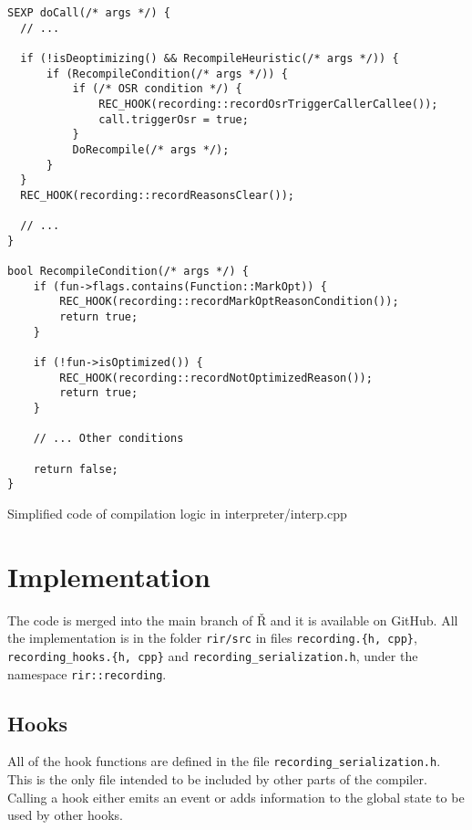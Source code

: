 \begin{listing}
	\centering
	\begin{verbatim}
SEXP doCall(/* args */) {
  // ...

  if (!isDeoptimizing() && RecompileHeuristic(/* args */)) {
      if (RecompileCondition(/* args */)) {
          if (/* OSR condition */) {
              REC_HOOK(recording::recordOsrTriggerCallerCallee());
              call.triggerOsr = true;
          }
          DoRecompile(/* args */);
      }
  }
  REC_HOOK(recording::recordReasonsClear());

  // ...
}

bool RecompileCondition(/* args */) {
    if (fun->flags.contains(Function::MarkOpt)) {
        REC_HOOK(recording::recordMarkOptReasonCondition());
        return true;
    }

    if (!fun->isOptimized()) {
        REC_HOOK(recording::recordNotOptimizedReason());
        return true;
    }

    // ... Other conditions

    return false;
}
  \end{verbatim}
	\caption{Simplified code of compilation logic in interpreter/interp.cpp}\label{lst:hook-docall}
\end{listing}

\section{Implementation}

The code is merged into the main branch of Ř and it is available on GitHub\cite{rsh-github}. All the implementation is in the folder \texttt{rir/src} in files \texttt{recording.\{h, cpp\}}, \texttt{recording\_hooks.\{h, cpp\}} and \texttt{recording\_serialization.h}, under the namespace \texttt{rir::recording}.

\subsection{Hooks}

All of the hook functions are defined in the file \texttt{recording\_serialization.h}. This is the only file intended to be included by other parts of the compiler. Calling a hook either emits an event or adds information to the global state to be used by other hooks.

